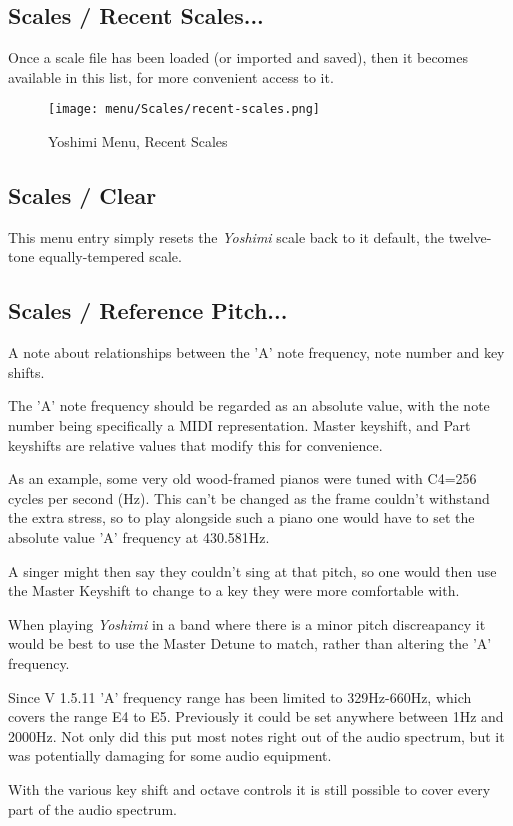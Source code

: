 \subsection{Scales / Recent Scales...}
\label{subsec:scales_recent_scales}

   Once a scale file has been loaded (or imported and saved), then it
   becomes available in this list, for more convenient access to it.

\begin{figure}[H]
   \centering
   \texttt{[image: menu/Scales/recent-scales.png]}
   \caption{Yoshimi Menu, Recent Scales}
   \label{fig:yoshimi_recent_scales}
\end{figure}

\subsection{Scales / Clear}
\label{subsec:scales_clear}

   This menu entry simply resets the \textsl{Yoshimi} scale back to it default,
   the twelve-tone equally-tempered scale.

\subsection{Scales / Reference Pitch...}
\label{subsec:scales_reference_pitch}
   A note about relationships between the 'A' note frequency, note number and
   key shifts.

   The 'A' note frequency should be regarded as an absolute value, with the
   note number being specifically a MIDI representation.
   Master keyshift, and Part keyshifts are relative values that modify this for
   convenience.

   As an example, some very old wood-framed pianos were tuned with C4=256 cycles
   per second (Hz). This can't be changed as the frame couldn't withstand the
   extra stress, so to play alongside such a piano one would have to set the
   absolute value 'A' frequency at 430.581Hz.

   A singer might then say they couldn't sing at that pitch, so one would then use
   the Master Keyshift to change to a key they were more comfortable with.

   When playing \textsl{Yoshimi} in a band where there is a minor pitch
   discreapancy it would be best to use the Master Detune to match, rather than
   altering the 'A' frequency.

   Since V 1.5.11 'A' frequency range has been limited to 329Hz-660Hz, which covers
   the range E4 to E5. Previously it could be set anywhere between 1Hz and 2000Hz.
   Not only did this put most notes right out of the audio spectrum, but it was potentially damaging for some audio equipment.

   With the various key shift and octave controls it is still possible to cover every part of the audio spectrum.

